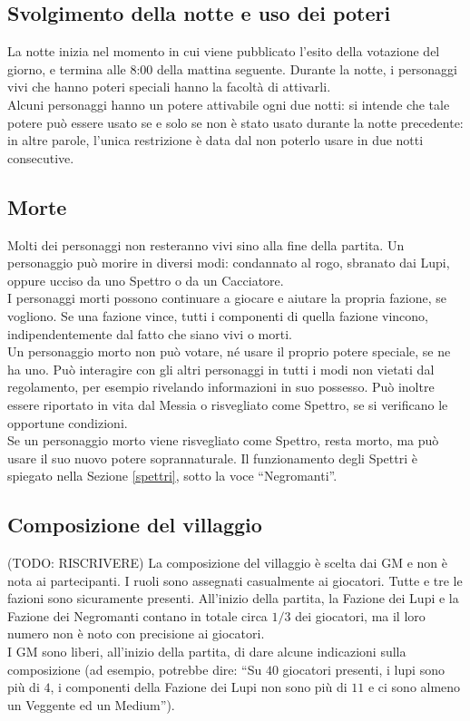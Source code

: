 \documentclass[a4paper,10pt]{article}
\begin{document}
\subsection{Svolgimento della notte e uso dei poteri}

La notte inizia nel momento in cui viene pubblicato l'esito della votazione del
giorno, e termina alle 8:00 della mattina seguente.
Durante la notte, i personaggi vivi che hanno poteri speciali hanno la facoltà
di attivarli.\\
Alcuni personaggi hanno un potere attivabile ogni due notti: si intende che tale
potere può essere usato se e solo se non è stato usato durante la notte
precedente: in altre parole, l'unica restrizione è data dal non poterlo usare in
due notti consecutive.

\subsection{Morte}

Molti dei personaggi non resteranno vivi sino alla fine della partita. Un
personaggio può morire in diversi modi: condannato al rogo, sbranato dai Lupi,
oppure ucciso da uno Spettro o da un Cacciatore.\\
I personaggi morti possono continuare a giocare e aiutare la propria fazione, se
vogliono. Se una fazione vince, tutti i componenti di quella fazione vincono,
indipendentemente dal fatto che siano vivi o morti.\\ 
Un personaggio morto non può votare, né usare il proprio potere speciale, se ne
ha uno. Può interagire con gli altri personaggi in tutti i modi non vietati dal
regolamento, per esempio rivelando informazioni in suo possesso. Può inoltre
essere riportato in vita dal Messia o risvegliato come Spettro, se si verificano
le opportune condizioni.\\
Se un personaggio morto viene risvegliato come Spettro, resta morto, ma può
usare il suo nuovo potere soprannaturale. Il funzionamento degli Spettri è
spiegato nella Sezione \ref{spettri}, sotto la voce ``Negromanti''.


\subsection{Composizione del villaggio}
 
(TODO: RISCRIVERE)
La composizione del villaggio è scelta dai GM e non è nota ai partecipanti. I
ruoli sono assegnati casualmente ai giocatori.
Tutte e tre le fazioni sono sicuramente presenti. All'inizio della partita, la
Fazione dei Lupi e la Fazione dei Negromanti contano in totale circa $1/3$ dei
giocatori, ma il loro numero non è noto con precisione ai giocatori.
\\
I GM sono liberi, all'inizio della partita, di dare alcune indicazioni sulla
composizione (ad esempio, potrebbe dire: ``Su $40$ giocatori presenti, i lupi
sono più di $4$, i componenti della Fazione dei Lupi non sono più di $11$ e ci
sono almeno un Veggente ed un Medium'').
\end{document}
